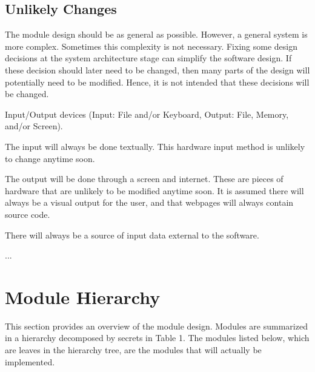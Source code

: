 \documentclass[12pt, titlepage]{article}
\newcounter{ucnum}
\newcommand{\uctheucnum}{UC\theucnum}
\begin{document}
\subsection{Unlikely Changes} \label{SecUchange}
The module design should be as general as possible. However, a general system is
more complex. Sometimes this complexity is not necessary. Fixing some design
decisions at the system architecture stage can simplify the software design. If
these decision should later need to be changed, then many parts of the design
will potentially need to be modified. Hence, it is not intended that these
decisions will be changed.
\begin{description}
\item[ \uctheucnum \label{ucIO}:] Input/Output devices
  (Input: File and/or Keyboard, Output: File, Memory, and/or Screen).

The input will always be done textually. This hardware input method is unlikely to change anytime soon.

The output will be done through a screen and internet. These are pieces of hardware that are unlikely to be modified anytime soon. It is assumed there will always be a visual output for the user, and that webpages will always contain source code.
\item[ \uctheucnum \label{ucInput}:] There will always be
  a source of input data external to the software.
\item ...
\end{description}
\section{Module Hierarchy} \label{SecMH}
This section provides an overview of the module design. Modules are summarized
in a hierarchy decomposed by secrets in Table 1. The modules listed
below, which are leaves in the hierarchy tree, are the modules that will
actually be implemented.
\end{document}
